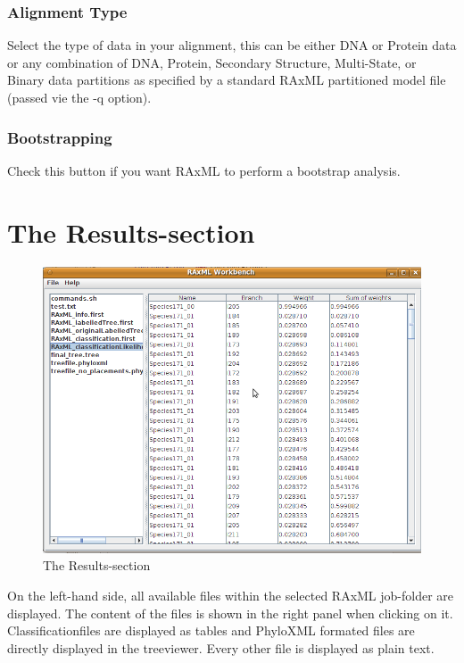 \documentclass{article}
\begin{document}
		\subsubsection*{Alignment Type}
	 		Select the type of data in your alignment, this can be either DNA or Protein data or any combination of DNA, Protein, Secondary Structure, Multi-State, or Binary data partitions as specified by a standard RAxML partitioned model file (passed vie the -q option).
	 	\subsubsection*{Bootstrapping}
			 Check this button if you want RAxML to perform a bootstrap analysis.
\section{The Results-section}
\begin{figure}[htb]
		\centering
		\includegraphics[scale=0.30]{./Results}
		\caption{The Results-section}
		\label{fig2}
	\end{figure}
		\noindent On the left-hand side, all available files within the selected RAxML job-folder are displayed. The content of the files is shown in the right panel when clicking on it. Classificationfiles are displayed as tables and PhyloXML formated files are directly displayed in the treeviewer. Every other file is displayed as plain text.
	
\end{document}

